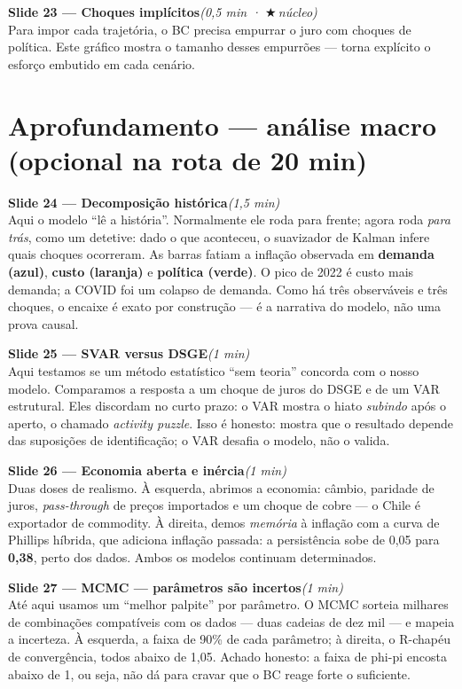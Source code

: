 \documentclass[11pt,a4paper]{article}
\newcommand{\slide}[3]{\medskip\noindent{\color{azul}\rule{3pt}{14pt}}\;
  \textbf{Slide #1 --- #2}\hfill\textit{(#3)}\\[1mm]}
\newcommand{\nucleo}{{\color{verdee}\footnotesize$\bigstar$\,núcleo}}
\begin{document}
\slide{23}{Choques implícitos}{0,5 min · \nucleo}
Para impor cada trajetória, o BC precisa empurrar o juro com choques de política. Este gráfico mostra o
tamanho desses empurrões --- torna explícito o esforço embutido em cada cenário.

\section{Aprofundamento --- análise macro (opcional na rota de 20 min)}

\slide{24}{Decomposição histórica}{1,5 min}
Aqui o modelo ``lê a história''. Normalmente ele roda para frente; agora roda \emph{para trás}, como um
detetive: dado o que aconteceu, o suavizador de Kalman infere quais choques ocorreram. As barras fatiam
a inflação observada em \textbf{demanda (azul)}, \textbf{custo (laranja)} e \textbf{política (verde)}. O
pico de 2022 é custo mais demanda; a COVID foi um colapso de demanda. Como há três observáveis e três
choques, o encaixe é exato por construção --- é a narrativa do modelo, não uma prova causal.

\slide{25}{SVAR versus DSGE}{1 min}
Aqui testamos se um método estatístico ``sem teoria'' concorda com o nosso modelo. Comparamos a
resposta a um choque de juros do DSGE e de um VAR estrutural. Eles discordam no curto prazo: o VAR
mostra o hiato \emph{subindo} após o aperto, o chamado \emph{activity puzzle}. Isso é honesto: mostra
que o resultado depende das suposições de identificação; o VAR desafia o modelo, não o valida.

\slide{26}{Economia aberta e inércia}{1 min}
Duas doses de realismo. À esquerda, abrimos a economia: câmbio, paridade de juros, \emph{pass-through}
de preços importados e um choque de cobre --- o Chile é exportador de commodity. À direita, demos
\emph{memória} à inflação com a curva de Phillips híbrida, que adiciona inflação passada: a
persistência sobe de 0,05 para \textbf{0,38}, perto dos dados. Ambos os modelos continuam determinados.

\slide{27}{MCMC --- parâmetros são incertos}{1 min}
Até aqui usamos um ``melhor palpite'' por parâmetro. O MCMC sorteia milhares de combinações compatíveis
com os dados --- duas cadeias de dez mil --- e mapeia a incerteza. À esquerda, a faixa de 90\% de cada
parâmetro; à direita, o R-chapéu de convergência, todos abaixo de 1,05. Achado honesto: a faixa de
phi-pi encosta abaixo de 1, ou seja, não dá para cravar que o BC reage forte o suficiente.
\end{document}
